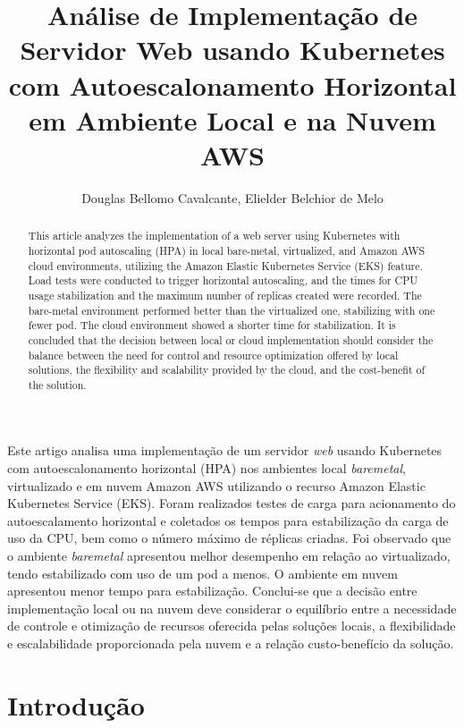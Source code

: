 \documentclass[12pt]{article}
\title{Análise de Implementação de Servidor Web usando Kubernetes com Autoescalonamento Horizontal em Ambiente Local e na Nuvem AWS}
\author{Douglas Bellomo Cavalcante\inst{1}, Elielder Belchior de Melo\inst{1} }
\begin{document}
 

\maketitle
     
\begin{resumo} 

Este artigo analisa uma implementação de um servidor \textit{web} usando Kubernetes com autoescalonamento horizontal (HPA) nos ambientes local \textit{baremetal}, virtualizado e em nuvem Amazon AWS utilizando o recurso Amazon Elastic Kubernetes Service (EKS). Foram realizados testes de carga para acionamento do autoescalamento horizontal e coletados os tempos para estabilização da carga de uso da CPU, bem como o número máximo de réplicas criadas. Foi observado que o ambiente \textit{baremetal} apresentou melhor desempenho em relação ao virtualizado, tendo estabilizado com uso de um pod a menos. O ambiente em nuvem apresentou menor tempo para estabilização. Conclui-se que a decisão entre implementação local ou na nuvem deve considerar o equilíbrio entre a necessidade de controle e otimização de recursos oferecida pelas soluções locais, a flexibilidade e escalabilidade proporcionada pela nuvem e a relação custo-benefício da solução.
  
\end{resumo}

\begin{abstract}

This article analyzes the implementation of a web server using Kubernetes with horizontal pod autoscaling (HPA) in local bare-metal, virtualized, and Amazon AWS cloud environments, utilizing the Amazon Elastic Kubernetes Service (EKS) feature. Load tests were conducted to trigger horizontal autoscaling, and the times for CPU usage stabilization and the maximum number of replicas created were recorded. The bare-metal environment performed better than the virtualized one, stabilizing with one fewer pod. The cloud environment showed a shorter time for stabilization. It is concluded that the decision between local or cloud implementation should consider the balance between the need for control and resource optimization offered by local solutions, the flexibility and scalability provided by the cloud, and the cost-benefit of the solution.
  
\end{abstract}


\section{Introdução}
\end{document}
